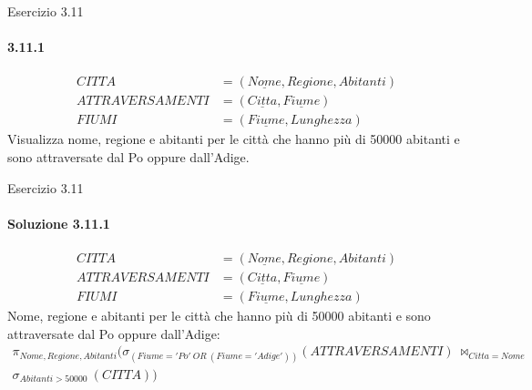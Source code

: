 \def\schemaEx3.11{\small \begin{align*}
    CITTA &= (\underline{Nome}, Regione, Abitanti)\\
    ATTRAVERSAMENTI &= (\underline{Citta}, \underline{Fiume})\\
    FIUMI &= (\underline{Fiume}, Lunghezza)
    \end{align*}}
\begin{frame}{Esercizio 3.11}
    \framesubtitle{3.11.1}
    \schemaEx3.11
    Visualizza nome, regione e abitanti per le citt\`a che hanno pi\`u di 50000 abitanti e sono attraversate dal Po oppure dall'Adige.
\end{frame}
%
\begin{frame}{Esercizio 3.11}
    \framesubtitle{Soluzione 3.11.1}
    \vspace*{-1.2cm}
    \schemaEx3.11
    {\small Nome, regione e abitanti per le citt\`a che hanno pi\`u di 50000 abitanti e sono attraversate dal Po oppure dall'Adige:}
    \small
    \begin{gather*}
        \pi_{Nome,Regione,Abitanti} (\sigma_{(Fiume='Po'~OR~(Fiume='Adige'))} (ATTRAVERSAMENTI)~\bowtie_{Citta=Nome}\\
        \sigma_{Abitanti>50000}~(CITTA))
    \end{gather*}
\end{frame}